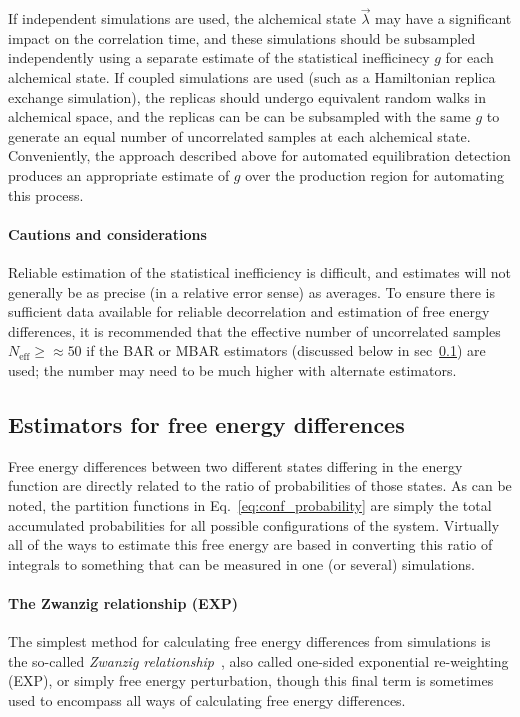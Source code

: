 \documentclass[9pt,bestpractices]{livecoms}
\begin{document}
If independent simulations are used, the alchemical state $\vec{\lambda}$ may have a significant impact on the correlation time, and these simulations should be subsampled independently using a separate estimate of the statistical inefficinecy $g$ for each alchemical state.
If coupled simulations are used (such as a Hamiltonian replica exchange simulation), the replicas should undergo equivalent random walks in alchemical space, and the replicas can be can be subsampled with the same $g$ to generate an equal number of uncorrelated samples at each alchemical state.
Conveniently, the approach described above for automated equilibration detection produces an appropriate estimate of $g$ over the production region for automating this process.

\paragraph{Cautions and considerations}
Reliable estimation of the statistical inefficiency is difficult, and estimates will not generally be as precise (in a relative error sense) as averages.
To ensure there is sufficient data available for reliable decorrelation and estimation of free energy differences, it is recommended that the effective number of uncorrelated samples $N_{\mathrm{eff}} \ge \approx 50$ if the BAR or MBAR estimators (discussed below in sec~\ref{subsec:estimators}) are used; the number may need to be much higher with alternate estimators.

\subsection{Estimators for free energy differences}
\label{subsec:estimators}
Free energy differences between two different states differing in the energy function are directly related to the
ratio of probabilities of those states.
As can be noted, the partition functions in Eq.~\ref{eq:conf_probability} are simply the total accumulated probabilities for all possible configurations of the system. Virtually all of the ways to estimate this free energy are based in converting this ratio of integrals to something that can be measured in one (or several) simulations.  

\paragraph{The Zwanzig relationship (EXP)}
The simplest method for calculating free energy differences from simulations is the so-called \textit{Zwanzig
relationship}~\cite{zwanzig1954hightemperature}, also called one-sided exponential re-weighting (EXP), or simply free energy perturbation, though this final term is sometimes used to encompass all ways of calculating free energy differences.
\end{document}
